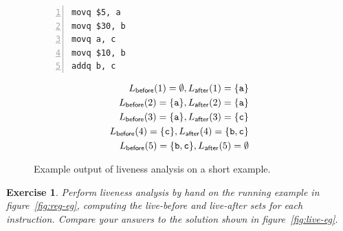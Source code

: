 \documentclass[7x10]{TimesAPriori_MIT}%
\newtheorem{exercise}[theorem]{Exercise}
\numberwithin{theorem}{chapter}
\numberwithin{definition}{chapter}
\numberwithin{equation}{chapter}
\begin{document}
\begin{figure}[tbp]
  \centering
  \begin{tcolorbox}[colback=white]
    \hspace{10pt}
  \begin{minipage}{0.4\textwidth}
\begin{lstlisting}[numbers=left,numberstyle=\tiny]
movq $5, a
movq $30, b
movq a, c
movq $10, b
addq b, c
\end{lstlisting}
\end{minipage}
\vrule\hspace{10pt}
\begin{minipage}{0.45\textwidth}
\begin{align*}
L_{\mathsf{before}}(1)=  \emptyset, 
L_{\mathsf{after}}(1)=  \{\text{\texttt{a}}\}\\
L_{\mathsf{before}}(2)=  \{\text{\texttt{a}}\},
L_{\mathsf{after}}(2)=  \{\text{\texttt{a}}\}\\
L_{\mathsf{before}}(3)=  \{\text{\texttt{a}}\},
L_{\mathsf{after}}(3)=  \{\text{\texttt{c}}\}\\
L_{\mathsf{before}}(4)=  \{\text{\texttt{c}}\},
L_{\mathsf{after}}(4)=  \{\text{\texttt{b}},\text{\texttt{c}}\}\\
L_{\mathsf{before}}(5)=  \{\text{\texttt{b}},\text{\texttt{c}}\},
L_{\mathsf{after}}(5)=  \emptyset
\end{align*}
\end{minipage}
\end{tcolorbox}
\caption{Example output of liveness analysis on a short example.}
\label{fig:liveness-example-0}
\end{figure}

\begin{exercise}\normalfont\normalsize
  Perform liveness analysis by hand on the running example in
  figure~\ref{fig:reg-eg}, computing the live-before and live-after
  sets for each instruction. Compare your answers to the solution
  shown in figure~\ref{fig:live-eg}.
\end{exercise}
\end{document}

